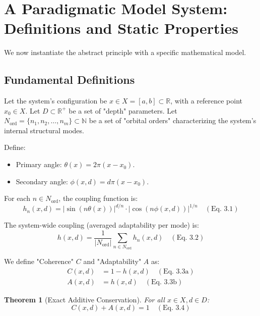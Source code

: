 \documentclass[11pt,a4paper]{article}
\newtheorem{theorem}{Theorem}[section]
\begin{document}
\section{A Paradigmatic Model System: Definitions and Static Properties}

We now instantiate the abstract principle with a specific mathematical model.

\subsection{Fundamental Definitions}
Let the system's configuration be $x \in X = [a,b] \subset \mathbb{R}$, with a reference point $x_0 \in X$.
Let $D \subset \mathbb{R}^+$ be a set of "depth" parameters.
Let $N_{\text{ord}} = \{n_1, n_2, \dots, n_m\} \subset \mathbb{N}$ be a set of "orbital orders" characterizing the system's internal structural modes.

Define:
\begin{itemize}
    \item Primary angle: $\theta(x) = 2\pi(x - x_0)$.
    \item Secondary angle: $\phi(x,d) = d\pi(x - x_0)$.
\end{itemize}

For each $n \in N_{\text{ord}}$, the coupling function is:
\begin{equation}
    h_n(x,d) = |\sin(n\theta(x))|^{d/n} \cdot |\cos(n\phi(x,d))|^{1/n} \quad (\text{Eq. 3.1})
\end{equation}

The system-wide coupling (averaged adaptability per mode) is:
\begin{equation}
    h(x,d) = \frac{1}{|N_{\text{ord}}|} \sum_{n \in N_{\text{ord}}} h_n(x,d) \quad (\text{Eq. 3.2})
\end{equation}

We define "Coherence" $C$ and "Adaptability" $A$ as:
\begin{align}
    C(x,d) &= 1 - h(x,d) \quad (\text{Eq. 3.3a})\\
    A(x,d) &= h(x,d) \quad (\text{Eq. 3.3b})
\end{align}

\begin{theorem}[Exact Additive Conservation]
For all $x \in X, d \in D$:
\begin{equation}
    C(x,d) + A(x,d) = 1 \quad (\text{Eq. 3.4})
\end{equation}
\end{theorem}
\end{document}
